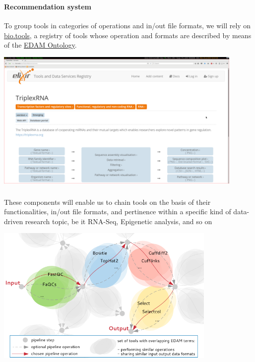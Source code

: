 \documentclass[xcolor=dvipsnames]{beamer}
\begin{document}
\begin{frame}
  \frametitle{\four}
  \framesubtitle{Recommendation system}
  To group tools in categories of operations and in/out file formats, we will rely on \href{https://bio.tools}{bio.tools}, a registry of tools whose operation and formats are described by means of the \href{https://github.com/edamontology/edamontology}{EDAM Ontology}.
  \begin{center}
    \includegraphics[width=0.90\textwidth]{images/screenshot_biotools_edam}
  \end{center}
\end{frame}

\begin{frame}
  \frametitle{\five}
  \vspace{0.1cm}
  These components will enable us to chain tools on the basis of their functionalities, in/out file formats, and pertinence within a specific kind of data-driven research topic, be it RNA-Seq, Epigenetic analysis, and so on
  \vspace{-0.2cm}
  \begin{center}
    \includegraphics[width=0.80\textwidth]{images/recommendation_system}
  \end{center}
\end{frame}
\end{document}

